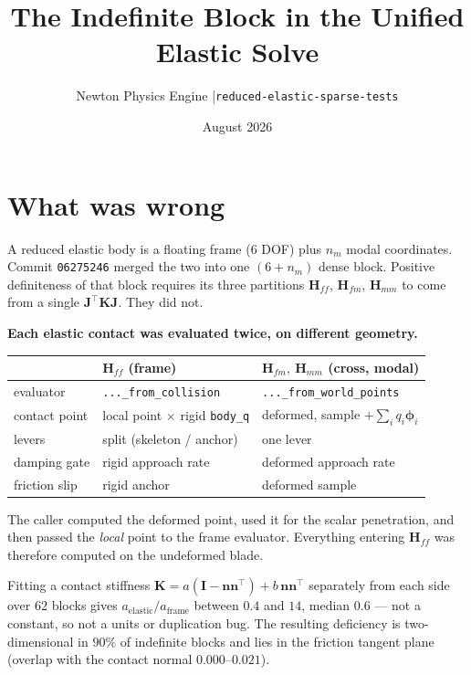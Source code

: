 \documentclass[11pt,a4paper]{article}
\title{\vspace{-1.2cm}\textbf{The Indefinite Block in the Unified Elastic Solve}}
\author{\normalsize Newton Physics Engine \quad|\quad \texttt{reduced-elastic-sparse-tests}}
\date{\normalsize August 2026}
\begin{document}
\maketitle
\vspace{-0.8cm}

\section*{What was wrong}

A reduced elastic body is a floating frame ($6$ DOF) plus $n_m$ modal
coordinates. Commit \texttt{06275246} merged the two into one $(6+n_m)$ dense
block. Positive definiteness of that block requires its three partitions
$\mathbf{H}_{ff}$, $\mathbf{H}_{fm}$, $\mathbf{H}_{mm}$ to come from a single
$\mathbf{J}^\top\mathbf{K}\mathbf{J}$. They did not.

\textbf{Each elastic contact was evaluated twice, on different geometry.}

\begin{center}\small
\begin{tabular}{@{}lll@{}}
\toprule
 & $\mathbf{H}_{ff}$ (frame) & $\mathbf{H}_{fm},\ \mathbf{H}_{mm}$ (cross, modal) \\
\midrule
evaluator & \texttt{...\_from\_collision} & \texttt{...\_from\_world\_points} \\
contact point & local point $\times$ rigid \texttt{body\_q} & deformed, sample $+\sum_i q_i\bm{\phi}_i$ \\
levers & split (skeleton / anchor) & one lever \\
damping gate & rigid approach rate & deformed approach rate \\
friction slip & rigid anchor & deformed sample \\
\bottomrule
\end{tabular}
\end{center}

The caller computed the deformed point, used it for the scalar penetration, and
then passed the \emph{local} point to the frame evaluator. Everything entering
$\mathbf{H}_{ff}$ was therefore computed on the undeformed blade.

Fitting a contact stiffness
$\mathbf{K}=a(\mathbf{I}-\mathbf{n}\mathbf{n}^\top)+b\,\mathbf{n}\mathbf{n}^\top$
separately from each side over $62$ blocks gives
$a_{\text{elastic}}/a_{\text{frame}}$ between $0.4$ and $14$, median $0.6$ ---
not a constant, so not a units or duplication bug. The resulting deficiency is
two-dimensional in $90\%$ of indefinite blocks and lies in the friction tangent
plane (overlap with the contact normal $0.000$--$0.021$).
\end{document}
